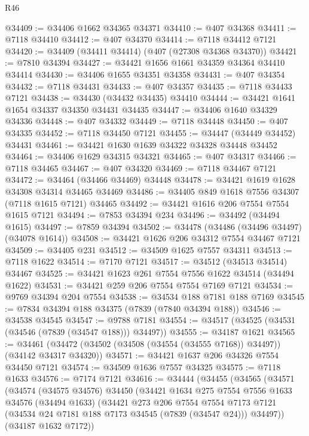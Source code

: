 \begin{lexlean}{R46}
\begin{coremodule}
@34409 := @34406 @1662 @34365 @34371
@34410 := @407 @34368
@34411 := @7118 @34410
@34412 := @407 @34370
@34414 := @7118 @34412 @7121
@34420 := @34409 (@34411 @34414) (@407 (@27308 @34368 @34370))
@34421 := @7810 @34394
@34427 := @34421 @1656 @1661 @34359 @34364 @34410 @34414
@34430 := @34406 @1655 @34351 @34358
@34431 := @407 @34354
@34432 := @7118 @34431
@34433 := @407 @34357
@34435 := @7118 @34433 @7121
@34438 := @34430 (@34432 @34435) @34410
@34444 := @34421 @1641 @1654 @34337 @34350 @34431 @34435
@34447 := @34406 @1640 @34329 @34336
@34448 := @407 @34332
@34449 := @7118 @34448
@34450 := @407 @34335
@34452 := @7118 @34450 @7121
@34455 := @34447 (@34449 @34452) @34431
@34461 := @34421 @1630 @1639 @34322 @34328 @34448 @34452
@34464 := @34406 @1629 @34315 @34321
@34465 := @407 @34317
@34466 := @7118 @34465
@34467 := @407 @34320
@34469 := @7118 @34467 @7121
@34472 := @34464 (@34466 @34469) @34448
@34478 := @34421 @1619 @1628 @34308 @34314 @34465 @34469
@34486 := @34405 @849 @1618 @7556 @34307 (@7118 @1615 @7121) @34465
@34492 := @34421 @1616 @206 @7554 @7554 @1615 @7121
@34494 := @7853 @34394 @234
@34496 := @34492 (@34494 @1615)
@34497 := @7859 @34394
@34502 := @34478 (@34486 (@34496 @34497) (@34078 @1614))
@34508 := @34421 @1626 @206 @34312 @7554 @34467 @7121
@34509 := @34405 @231
@34512 := @34509 @1625 @7557 @34311
@34513 := @7118 @1622
@34514 := @7170 @7121
@34517 := @34512 (@34513 @34514) @34467
@34525 := @34421 @1623 @261 @7554 @7556 @1622 @34514 (@34494 @1622)
@34531 := @34421 @259 @206 @7554 @7554 @7169 @7121
@34534 := @9769 @34394 @204 @7554
@34538 := @34534 @188 @7181 @188 @7169
@34545 := @7834 @34394 @188 @34375 (@7839 (@7840 @34394 @188))
@34546 := @34538 @34545
@34547 := @9788 @7181
@34554 := @34517 (@34525 (@34531 (@34546 (@7839 (@34547 @188))) @34497))
@34555 := @34187 @1621
@34565 := @34461 (@34472 (@34502 (@34508 (@34554 (@34555 @7168)) @34497)) (@34142 @34317 @34320))
@34571 := @34421 @1637 @206 @34326 @7554 @34450 @7121
@34574 := @34509 @1636 @7557 @34325
@34575 := @7118 @1633
@34576 := @7174 @7121
@34616 := @34444
    (@34455
      (@34565
        (@34571
          (@34574
            (@34575 @34576)
            @34450
            (@34421
              @1634
              @275
              @7554
              @7556
              @1633
              @34576
              (@34494 @1633)
              (@34421
                @273
                @206
                @7554
                @7554
                @7173
                @7121
                (@34534 @24 @7181 @188 @7173 @34545 (@7839 (@34547 @24)))
                @34497))
            (@34187 @1632 @7172))

\end{coremodule}
\end{lexlean}
